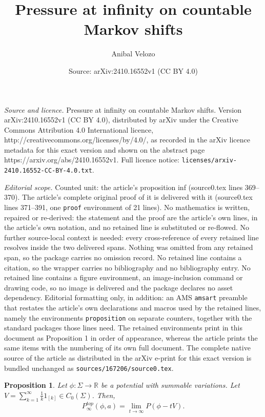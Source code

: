 \documentclass[10pt,a4paper]{amsart}
\title{Pressure at infinity on countable Markov shifts}
\author{Anibal Velozo}
\date{Source: arXiv:2410.16552v1 (CC BY 4.0)}
\newtheorem{proposition}{Proposition}
\def\R{{\mathbb R}}
\begin{document}
\maketitle

\noindent\emph{Source and licence.} Pressure at infinity on countable Markov shifts. Version arXiv:2410.16552v1 (CC BY 4.0), distributed by arXiv under the Creative Commons Attribution 4.0 International licence, http://creativecommons.org/licenses/by/4.0/, as recorded in the arXiv licence metadata for this exact version and shown on the abstract page https://arxiv.org/abs/2410.16552v1. Full licence notice: \texttt{licenses/arxiv-2410.16552-CC-BY-4.0.txt}.\par\smallskip

\noindent\textit{Editorial scope.} Counted unit: the article's proposition inf (source0.tex lines 369--370). The article's complete original proof of it is delivered with it (source0.tex lines 371--391, one \texttt{proof} environment of 21 lines). No mathematics is written, repaired or re-derived: the statement and the proof are the article's own lines, in the article's own notation, and no retained line is substituted or re-flowed.  No further source-local context is needed: every cross-reference of every retained line resolves inside the two delivered spans.  Nothing was omitted from any retained span, so the package carries no omission record.  No retained line contains a citation, so the wrapper carries no bibliography and no bibliography entry.  No retained line contains a figure environment, an image-inclusion command or drawing code, so no image is delivered and the package declares no asset dependency.  Editorial formatting only, in addition: an AMS \texttt{amsart} preamble that restates the article's own declarations and macros used by the retained lines, namely the environments \texttt{proposition} on separate counters, together with the standard packages those lines need.  The retained environments print in this document as Proposition 1 in order of appearance, whereas the article prints the same items with the numbering of its own full document.  The complete native source of the article as distributed in the arXiv e-print for this exact version is bundled unchanged as \texttt{sources/167206/source0.tex}.
\begin{proposition}\label{inf} Let $\phi:\Sigma\to\R$ be a potential with summable variations. Let $V=\sum_{k=1}^\infty \frac{1}{k} 1_{[k]}\in C_0(\Sigma)$. Then, $$P^{top}_\infty(\phi,a)=\lim_{t\to\infty} P(\phi-tV).$$
\end{proposition}
\end{document}
